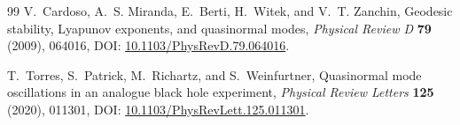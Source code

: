 \documentclass[11pt]{article}
\theoremstyle{definition}
\theoremstyle{plain}
\theoremstyle{remark}
\begin{document}
\begin{thebibliography}{99}
            V.~Cardoso, A.~S. Miranda, E.~Berti, H.~Witek, and V.~T. Zanchin,
            \newblock Geodesic stability, Lyapunov exponents, and quasinormal modes,
            \newblock \emph{Physical Review D} \textbf{79} (2009), 064016,
            \newblock DOI: \href{https://doi.org/10.1103/PhysRevD.79.064016}{10.1103/PhysRevD.79.064016}.

            T.~Torres, S.~Patrick, M.~Richartz, and S.~Weinfurtner,
            \newblock Quasinormal mode oscillations in an analogue black hole experiment,
            \newblock \emph{Physical Review Letters} \textbf{125} (2020), 011301,
            \newblock DOI: \href{https://doi.org/10.1103/PhysRevLett.125.011301}{10.1103/PhysRevLett.125.011301}.

        \end{thebibliography}
\end{document}
